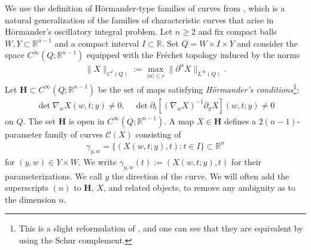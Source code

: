 \documentclass[reqno,11pt]{amsart}
\numberwithin{equation}{section}
\numberwithin{figure}{section}
\def\R{\mathbb{R}}
\renewcommand\leq{\leqslant}
\renewcommand\geq{\geqslant}
\theoremstyle{plain}
\theoremstyle{definition}
\begin{document}
    We use the definition of H\"ormander-type families of curves from \cite{guo2026curvedkakeyaproblemsprojective}, which is a natural generalization of the families of characteristic curves that arise in H\"ormander's oscillatory integral problem. Let $n \geq 2$ and fix compact balls $W,Y \subset \R^{n-1}$ and a compact interval $I \subset \R$. Set $Q = W \times I \times Y$ and consider the space $C^\infty(Q ; \R^{n-1})$ equipped with the Fr\'echet topology induced by the norms
    \begin{align}
        \|X \|_{C^r(Q)} := \max_{|\alpha| \leq r} \| \partial^\alpha  X\|_{L^\infty(Q)}.
    \end{align}
    Let $\mathbf H \subset C^\infty(Q; \R^{n-1})$ be the set of maps satisfying \emph{H\"ormander's conditions}\footnote{This is a slight reformulation of \cite[Definition 1.14]{guo2026curvedkakeyaproblemsprojective}, and one can see that they are equivalent by using the Schur complement.}:
    \begin{align}
        \det\nabla_w X(w,t;y) \neq 0, \quad \det \partial_t [(\nabla_w X)^{-1} \partial_y X](w,t;y) \neq 0
    \end{align}
    on $Q$.
    The set $\mathbf H$ is open in $C^\infty(Q; \R^{n-1})$. 
    A map $X \in \mathbf H$ defines a $2(n-1)$-parameter family of curves $\mathcal C(X)$ consisting of 
    \begin{align}
        \gamma_{y,w} = \{(X(w,t;y),t) : t \in I\} \subset \R^{n}
    \end{align}
    for $(y,w) \in Y \times W$. We write $\gamma_{y,w}(t):=(X(w,t;y),t)$ for their parameterizations. 
    We call $y$ the direction of the curve. We will often add the superscripts $(n)$ to $\mathbf H$, $X$, and related objects, to remove any ambiguity as to the dimension $n$. 
    
\end{document}
